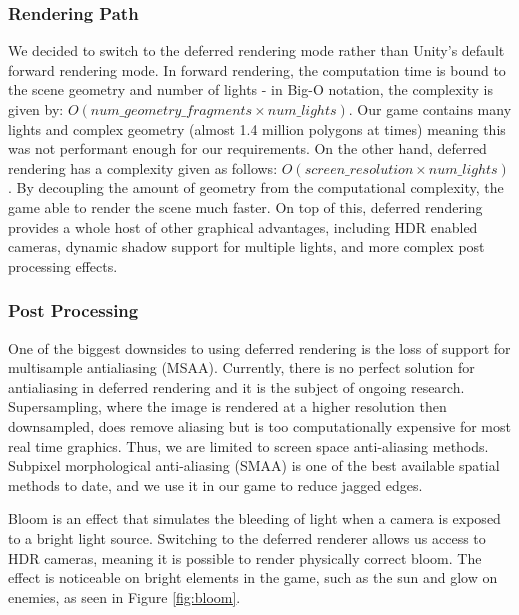 \documentclass[a4paper,11pt]{article}
\begin{document}
\subsubsection{Rendering Path}
We decided to switch to the deferred rendering mode rather than Unity’s default forward rendering mode. In forward rendering, the computation time is bound to the scene geometry and number of lights - in Big-O notation, the complexity is given by: $O(num\_geometry\_fragments \times num\_lights)$. Our game contains many lights and complex geometry (almost 1.4 million polygons at times) meaning this was not performant enough for our requirements. On the other hand, deferred rendering has a complexity given as follows\cite{unity_deferred}: $O(screen\_resolution \times num\_lights)$. By decoupling the amount of geometry from the computational complexity, the game able to render the scene much faster. On top of this, deferred rendering provides a whole host of other graphical advantages, including HDR enabled cameras, dynamic shadow support for multiple lights, and more complex post processing effects.

\subsubsection{Post Processing}
One of the biggest downsides to using deferred rendering is the loss of support for multisample antialiasing (MSAA). Currently, there is no perfect solution for antialiasing in deferred rendering and it is the subject of ongoing research. Supersampling, where the image is rendered at a higher resolution then downsampled, does remove aliasing but is too computationally expensive for most real time graphics. Thus, we are limited to screen space anti-aliasing methods. Subpixel morphological anti-aliasing (SMAA) is one of the best available spatial methods to date, and we use it in our game to reduce jagged edges.

Bloom is an effect that simulates the bleeding of light when a camera is exposed to a bright light source. Switching to the deferred renderer allows us access to HDR cameras, meaning it is possible to render physically correct bloom. The effect is noticeable on bright elements in the game, such as the sun and glow on enemies, as seen in Figure \ref{fig:bloom}.
\end{document}
